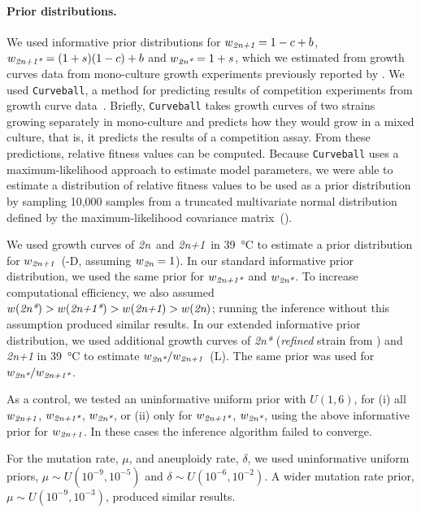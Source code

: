\documentclass[12pt]{extarticle}
\newcommand{\euwt}{\emph{2n}}
\newcommand{\anwt}{\emph{2n+1}}
\newcommand{\eumt}{\emph{2n*}}
\newcommand{\anmt}{\emph{2n+1*}}
\begin{document}
\paragraph{Prior distributions.} We used informative prior distributions for $w_{\anwt}=1-c+b$, $w_{\anmt}=(1+s)(1-c)+b$ and $w_{\eumt}=1+s$, which we estimated from growth curves data from mono-culture growth experiments previously reported by \citet[Figs. 3C, 4A, and S2]{Yona2012}.
We used \texttt{Curveball}, a method for predicting results of competition experiments from growth curve data~\citep[\href{https://curveball.yoavram.com}{curveball.yoavram.com}]{Ram2019}. Briefly, \texttt{Curveball} takes growth curves of two strains growing separately in mono-culture and predicts how they would grow in a mixed culture, that is, it predicts the results of a competition assay.
From these predictions, relative fitness values can be computed. Because \texttt{Curveball} uses a maximum-likelihood approach to estimate model parameters, we were able to estimate a distribution of relative fitness values to be used as a prior distribution by sampling 10,000 samples from a truncated multivariate normal distribution defined by the maximum-likelihood covariance matrix~().

We used growth curves of \euwt\ and \anwt\ in \SI{39}{\celsius} to estimate a prior distribution for $w_{\anwt}$~(-D, assuming $w_{\euwt}=1$). In our standard informative prior distribution, we used the same prior for $w_{\anmt}$ and $w_{\eumt}$. 
To increase computational efficiency, we also assumed $w(\eumt)>w(\anmt)>w(\anwt)>w(\euwt)$; running the inference without this assumption produced similar results. 
In our extended informative prior distribution, we used additional growth curves of \eumt\; (\emph{refined} strain from \citet{Yona2012}) and \anwt\; in \SI{39}{\celsius} to estimate $w_{\eumt}/w_{\anwt}$~(L). The same prior was used for $w_{\eumt}/w_{\anmt}$.

As a control, we tested an uninformative uniform prior with $\mathit{U}(1,6)$, for (i) all $w_{\anwt}$, $w_{\anmt}$, $w_{\eumt}$, or (ii) only for $w_{\anmt}$, $w_{\eumt}$, using the above informative prior for $w_{\anwt}$. In these cases the inference algorithm failed to converge.
 
For the mutation rate, $\mu$, and aneuploidy rate, $\delta$, we used uninformative uniform priors, $\mu \sim \mathit{U}(10^{-9},10^{-5})$ and $\delta \sim \mathit{U}(10^{-6},10^{-2})$. A wider mutation rate prior, $\mu \sim \mathit{U}(10^{-9},10^{-3})$, produced similar results.
\end{document}
